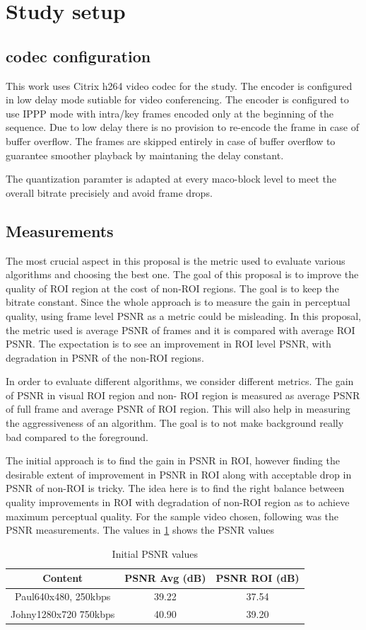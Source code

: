 \documentclass[11pt]{article} %
\begin{document}
\section{Study setup}
\subsection{codec configuration}      
This work uses Citrix h264 video codec for the study. The encoder is configured in low delay mode sutiable for video conferencing. The encoder is configured to use IPPP mode with intra/key frames encoded only at the beginning of the sequence. Due to low delay there is no provision to re-encode the frame in case of buffer overflow. The frames are skipped entirely in case of buffer overflow to guarantee smoother playback by maintaning the delay constant. 

The quantization paramter is adapted at every maco-block level to meet the overall bitrate precisiely and avoid frame drops. 
\subsection{Measurements}

The most crucial aspect in this proposal is the metric used to evaluate various algorithms and choosing the best one. The goal of this proposal is to improve the quality of ROI region at the cost of non-ROI regions. The goal is to keep the bitrate constant. Since the whole approach is to measure the gain in perceptual quality, using frame level PSNR as a metric could be misleading.
In this proposal, the metric used is average PSNR of frames and it is compared with average ROI PSNR. The expectation is to see an improvement in ROI level PSNR, with degradation in PSNR of the non-ROI regions. 

In order to evaluate different algorithms, we consider different metrics. The gain of PSNR in visual ROI region and non- ROI region is measured as average PSNR of full frame and average PSNR of ROI region. This will also help in measuring the aggressiveness of an algorithm. The goal is to not make background really bad compared to the foreground.

The initial approach is to find the gain in PSNR in ROI, however finding the desirable extent of improvement in PSNR in ROI along with acceptable drop in PSNR of non-ROI is tricky. The idea here is to find the right balance between quality improvements in ROI with degradation of non-ROI region as to achieve maximum perceptual quality. For the sample video chosen, following was the PSNR measurements. The values in \ref{InitPSNR1} shows the PSNR values 
\begin{table} [h!]
\centering
\begin{tabular}{ |c|c|c| }
 \hline
Content & PSNR Avg (dB) & PSNR ROI (dB) \\
 \hline 
 Paul640x480, 250kbps & 39.22 & 37.54 \\ 
 Johny1280x720 750kbps & 40.90 & 39.20 \\  
 \hline
\end{tabular}
 \caption{Initial PSNR values}
 \label{InitPSNR1}
\end{table}
\end{document}

